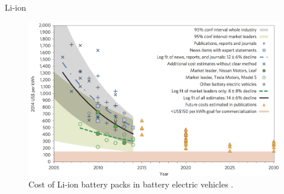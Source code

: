 Li-ion\cite{Nykvist2015}

\begin{figure}[htbp]  
\centering
\includegraphics[width=0.95\linewidth]{FIG/CostofLi-ion}
\caption[Cost of Li-ion battery packs in battery electric vehicles.]{Cost of Li-ion battery packs in battery electric vehicles \cite{Nykvist2015}.}\label{CostofLi-ion}
\end{figure}